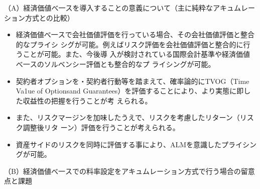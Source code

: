 \documentclass[report,gutter=10mm,fore-edge=10mm,uplatex,dvipdfmx]{jlreq}
\begin{document}
（A）経済価値べ一スを導入することの意義について（主に純粋なアキュムレーション方式との比較）
\begin{itemize}
 \item 経済価値べ一スで会社価値評価を行っている場合、その会社価値評価と整合的なプライシ
シグが可能。例えばリスク評価を会社価値評価と整合的に行うことが可能。また、今後導
入が検討されている国際会計基準や経済価値べ一スのソルベンシー評価とも整合的なプ
ライシングが可能。
 \item  契約者オプションを・契約者行動等を踏まえて、確率論的にTVOG（Time Va1ue of Optionsand Guarantees）を評価することにより、より実態に即した収益性の把握を行うことが考
えられる。
 \item また、リスクマージンを加味したうえで、リスクを考慮したリターン（リスク調整後リタ
ーン）評価を行うことが考えられる。
 \item 資産サイドのリスクを同時に評価する事により、ALMを意識したプライシングが可能。
\end{itemize}
（B）経済価値べ一スでの料率設定をアキュムレーション方式で行う場合の留意点と課題
\end{document}
